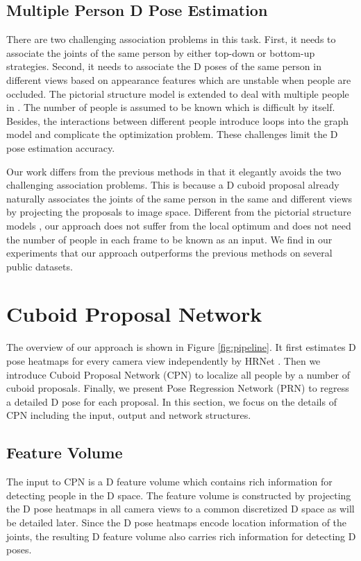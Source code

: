 \documentclass[runningheads]{llncs}
\begin{document}
 
 
\subsection{Multiple Person D Pose Estimation}
There are two challenging association problems in this task. First, it needs to associate the joints of the same person by either top-down \cite{rogez2019lcr,he2017mask} or bottom-up \cite{cao2017realtime,kreiss2019pifpaf,newell2017associative} strategies. Second, it needs to associate the D poses of the same person in different views based on appearance features \cite{dong2019fast,bridgeman2019multi} which are unstable when people are occluded. The pictorial structure model is extended to deal with multiple people in \cite{belagiannis20143d,belagiannis20153d}. The number of people is assumed to be known which is difficult by itself. Besides, the interactions between different people introduce loops into the graph model and complicate the optimization problem. These challenges limit the D pose estimation accuracy.

Our work differs from the previous methods \cite{dong2019fast,bridgeman2019multi} in that it elegantly avoids the two challenging association problems. This is because a D cuboid proposal already naturally associates the joints of the same person in the same and different views by projecting the proposals to image space. Different from the pictorial structure models \cite{belagiannis20143d,belagiannis20153d}, our approach does not suffer from the local optimum and does not need the number of people in each frame to be known as an input. We find in our experiments that our approach outperforms the previous methods on several public datasets.

\section{Cuboid Proposal Network}
The overview of our approach is shown in Figure \ref{fig:pipeline}. It first estimates D pose heatmaps for every camera view independently by HRNet \cite{sun2019deep}. Then we introduce Cuboid Proposal Network (CPN) to localize all people by a number of cuboid proposals. Finally, we present Pose Regression Network (PRN) to regress a detailed D pose for each proposal. In this section, we focus on the details of CPN including the input, output and network structures.


\subsection{Feature Volume}
\label{sec:featurevolume}
The input to CPN is a D feature volume which contains rich information for detecting people in the D space. The feature volume is constructed by projecting the D pose heatmaps in all camera views to a common discretized D space as will be detailed later. Since the D pose heatmaps encode location information of the joints, the resulting D feature volume also carries rich information for detecting D poses.
\end{document}
